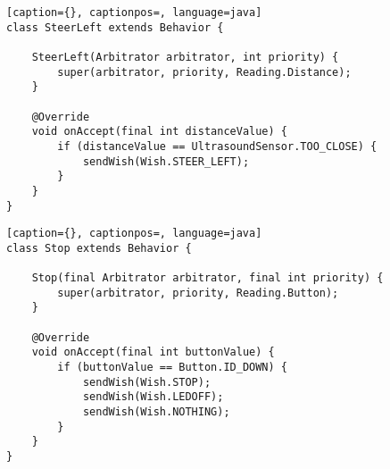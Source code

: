 \begin{lstlisting}[caption={}, captionpos=, language=java]
class SteerLeft extends Behavior {

    SteerLeft(Arbitrator arbitrator, int priority) {
        super(arbitrator, priority, Reading.Distance);
    }

    @Override
    void onAccept(final int distanceValue) {
        if (distanceValue == UltrasoundSensor.TOO_CLOSE) {
            sendWish(Wish.STEER_LEFT);
        }
    }
}
\end{lstlisting}

\begin{lstlisting}[caption={}, captionpos=, language=java]
class Stop extends Behavior {

    Stop(final Arbitrator arbitrator, final int priority) {
        super(arbitrator, priority, Reading.Button);
    }

    @Override
    void onAccept(final int buttonValue) {
        if (buttonValue == Button.ID_DOWN) {
            sendWish(Wish.STOP);
            sendWish(Wish.LEDOFF);
            sendWish(Wish.NOTHING);
        }
    }
}
\end{lstlisting}

